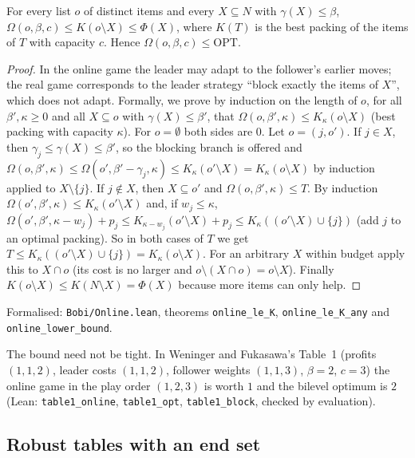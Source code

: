 \begin{theorem}\label{thm:online}
For every list $o$ of distinct items and every $X\subseteq N$ with
$\gamma(X)\le\beta$,
$\Omega(o,\beta,c)\le K(o\setminus X)\le\Phi(X)$, where $K(T)$ is the best
packing of the items of $T$ with capacity $c$. Hence $\Omega(o,\beta,c)\le\mathrm{OPT}$.
\end{theorem}
\begin{proof}
In the online game the leader may adapt to the follower's earlier moves; the
real game corresponds to the leader strategy ``block exactly the items of
$X$'', which does not adapt. Formally, we prove by induction on the length of
$o$, for all $\beta',\kappa\ge 0$ and all $X\subseteq o$ with $\gamma(X)\le\beta'$,
that $\Omega(o,\beta',\kappa)\le K_\kappa(o\setminus X)$ (best packing with
capacity $\kappa$). For $o=\emptyset$ both sides are $0$. Let $o=(j,o')$. If
$j\in X$, then $\gamma_j\le\gamma(X)\le\beta'$, so the blocking branch is offered and
$\Omega(o,\beta',\kappa)\le\Omega(o',\beta'-\gamma_j,\kappa)\le K_\kappa(o'\setminus X)=K_\kappa(o\setminus X)$
by induction applied to $X\setminus\{j\}$. If $j\notin X$, then $X\subseteq o'$ and
$\Omega(o,\beta',\kappa)\le T$. By induction $\Omega(o',\beta',\kappa)\le K_\kappa(o'\setminus X)$
and, if $w_j\le\kappa$,
$\Omega(o',\beta',\kappa-w_j)+p_j\le K_{\kappa-w_j}(o'\setminus X)+p_j\le K_\kappa((o'\setminus X)\cup\{j\})$
(add $j$ to an optimal packing). So in both cases of $T$ we get
$T\le K_\kappa((o'\setminus X)\cup\{j\})=K_\kappa(o\setminus X)$. For an arbitrary $X$ within
budget apply this to $X\cap o$ (its cost is no larger and $o\setminus(X\cap o)=o\setminus X$).
Finally $K(o\setminus X)\le K(N\setminus X)=\Phi(X)$ because more items can only help.
\end{proof}
{\raggedright\noindent Formalised: \texttt{Bobi/Online.lean}, theorems
\texttt{online\_le\_K}, \texttt{online\_le\_K\_any} and
\texttt{online\_lower\_bound}.\par}

\begin{remark}
The bound need not be tight. In Weninger and Fukasawa's Table~1 (profits
$(1,1,2)$, leader costs $(1,1,2)$, follower weights $(1,1,3)$, $\beta=2$, $c=3$)
the online game in the play order $(1,2,3)$ is worth $1$ and the bilevel optimum is $2$ (Lean:
\texttt{table1\_online}, \texttt{table1\_opt}, \texttt{table1\_block}, checked by
evaluation).
\end{remark}

\subsection{Robust tables with an end set}

